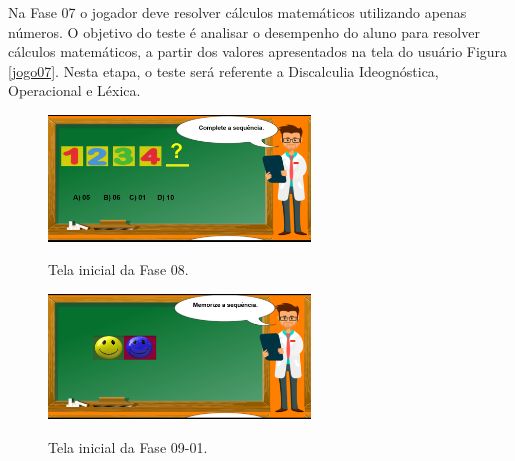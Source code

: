 \documentclass[
	12pt,				%
    oneside,			%
	a4paper,			%
	english,			%
	french,				%
	spanish,			%
	brazil,				%
	]{abntex2}
\begin{document}
Na Fase 07 o jogador deve resolver cálculos matemáticos utilizando apenas números. O objetivo do teste é analisar o desempenho do aluno para resolver cálculos matemáticos, a partir dos valores apresentados na tela do usuário Figura \ref{jogo07}. Nesta etapa, o teste será referente a Discalculia Ideognóstica, Operacional e Léxica.

\begin{figure} [h] 


\caption{Tela inicial da Fase 08.}

\includegraphics[width=0.62\textwidth]{jogo08.png} %
\centering
\\
\label{jogo08} 
\end{figure}

\begin{figure} [h] 


\caption{Tela inicial da Fase 09-01.}

\includegraphics[width=0.62\textwidth]{jogo09_01.png} %
\centering
\\
\label{jogo09_01} 
\end{figure}
\end{document}
